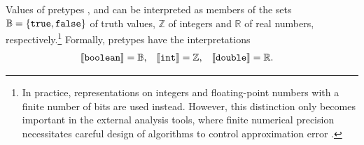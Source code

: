 Values of pretypes ,  and  can be interpreted as members of the sets \(\mathbb{B} = \{\texttt{\upshape true}, \texttt{\upshape false}\}\) of truth values, \(\mathbb{Z}\) of integers and \(\mathbb{R}\) of real numbers, respectively.\footnote{In practice, representations on integers and floating-point numbers with a finite number of bits are used instead. However, this distinction only becomes important in the external analysis tools, where finite numerical precision necessitates careful design of algorithms to control approximation error .} Formally, pretypes have the interpretations
\begin{align}
  \llbracket \texttt{\upshape boolean} \rrbracket &= \mathbb{B} \text,
  & \llbracket \texttt{\upshape int} \rrbracket &= \mathbb{Z} \text,
  & \llbracket \texttt{\upshape double} \rrbracket &= \mathbb{R} \text.
\end{align}

